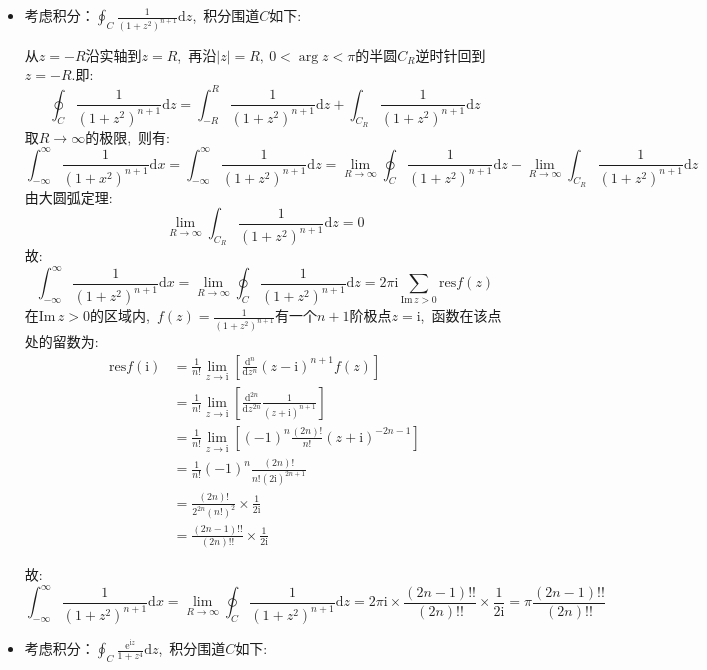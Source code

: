 \documentclass[a4paper,fontset=windows]{ctexart}
\begin{document}
\begin{itemize}
\smallskip
\item[6.(3)]
考虑积分：$\oint_{C}\frac{1}{\left(1+z^2\right)^{n+1}}\mathrm{d}z$,\ 积分围道$C$如下:

从$z=-R$沿实轴到$z=R$,\ 再沿$|z|=R,\ 0<\arg z<\pi$的半圆$C_R$逆时针回到$z=-R$.即:
\[
\oint_{C}\frac{1}{\left(1+z^2\right)^{n+1}}\mathrm{d}z
=\int_{-R}^{R}\frac{1}{\left(1+z^2\right)^{n+1}}\mathrm{d}z+\int_{C_R}\frac{1}{\left(1+z^2\right)^{n+1}}\mathrm{d}z
\]
取$R\rightarrow\infty$的极限,\ 则有:
\[
\int_{-\infty}^{\infty}\frac{1}{\left(1+x^2\right)^{n+1}}\mathrm{d}x
=\int_{-\infty}^{\infty}\frac{1}{\left(1+z^2\right)^{n+1}}\mathrm{d}z
=\lim_{R \to \infty}\oint_{C}\frac{1}{\left(1+z^2\right)^{n+1}}\mathrm{d}z-\lim_{R \to \infty}\int_{C_R}\frac{1}{\left(1+z^2\right)^{n+1}}\mathrm{d}z
\]
由大圆弧定理:
\[
\lim_{R \to \infty}\int_{C_R}\frac{1}{\left(1+z^2\right)^{n+1}}\mathrm{d}z=0
\]
故:
\[
\int_{-\infty}^{\infty}\frac{1}{\left(1+z^2\right)^{n+1}}\mathrm{d}x
=\lim_{R \to \infty}\oint_{C}\frac{1}{\left(1+z^2\right)^{n+1}}\mathrm{d}z
=2\pi\mathrm{i}\sum_{\mathrm{Im}\,z>0}\mathrm{res}f(z)
\]
在$\mathrm{Im}\,z>0$的区域内,\ $f(z)=\frac{1}{\left(1+z^2\right)^{n+1}}$有一个$n+1$阶极点$z=\mathrm{i}$,\ 函数在该点处的留数为:
\begin{align*}
\mathrm{res}f(\mathrm{i})
&=\frac{1}{n!}{\lim_{z \to \mathrm{i}}}\left[\frac{\mathrm{d}^{n}}{\mathrm{d}z^{n}}(z-\mathrm{i})^{n+1}f(z)\right] \\
&=\frac{1}{n!}{\lim_{z \to \mathrm{i}}}\left[\frac{\mathrm{d}^{2n}}{\mathrm{d}z^{2n}}\frac{1}{(z+\mathrm{i})^{n+1}}\right] \\
&=\frac{1}{n!}{\lim_{z \to \mathrm{i}}}\left[(-1)^n\frac{(2n)!}{n!}(z+\mathrm{i})^{-2n-1}\right] \\
&=\frac{1}{n!}(-1)^n\frac{(2n)!}{n!(2\mathrm{i})^{2n+1}} \\
&=\frac{(2n)!}{2^{2n}(n!)^2}\times\frac{1}{2\mathrm{i}} \\
&=\frac{(2n-1)!!}{(2n)!!}\times\frac{1}{2\mathrm{i}}
\end{align*}

故:
\[
\int_{-\infty}^{\infty}\frac{1}{\left(1+z^2\right)^{n+1}}\mathrm{d}x
=\lim_{R \to \infty}\oint_{C}\frac{1}{\left(1+z^2\right)^{n+1}}\mathrm{d}z
=2\pi \mathrm{i}\times\frac{(2n-1)!!}{(2n)!!}\times\frac{1}{2\mathrm{i}}
=\pi\frac{(2n-1)!!}{(2n)!!}
\]

\bigskip
\item[7.(1)]
考虑积分：$\oint_{C}\frac{\mathrm{e}^{\mathrm{i}z}}{1+z^4}\mathrm{d}z$,\ 积分围道$C$如下:


\end{itemize}
\end{document}
